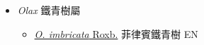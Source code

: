 
  \begin{itemize}
 \item[] \textit{Olax} 鐵青樹屬
                    
  \begin{itemize}
        \item[] \href{http://www.theplantlist.org/tpl1.1/search?q=Olax+imbricata}{\textit{O. imbricata} Roxb.}   菲律賓鐵青樹 EN
  \end{itemize}
  \end{itemize}
